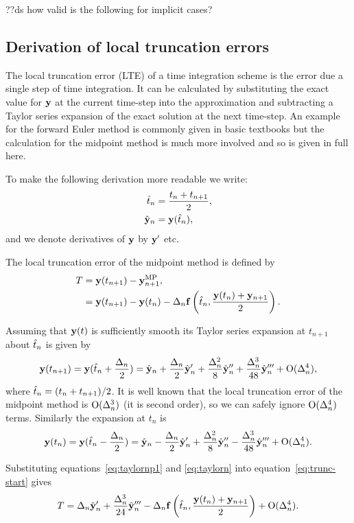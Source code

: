??ds how valid is the following for implicit cases?

\subsection{Derivation of local truncation errors}

The local truncation error (LTE) of a time integration scheme is the error due a single step of time integration.
It can be calculated by substituting the exact value for $\mathbf{y}$ at the current time-step into the approximation and subtracting a Taylor series expansion of the exact solution at the next time-step.
An example for the forward Euler method is commonly given in basic textbooks but the calculation for the midpoint method is much more involved and so is given in full here.

To make the following derivation more readable we write:
\begin{align}
  \hat{t}_n &= \frac{t_n + t_{n+1}}{2}, \notag\\
  \hat{\mathbf{y}}_n &= \mathbf{y}(\hat{t}_n),
\end{align}
and we denote derivatives of $\mathbf{y}$ by $\mathbf{y}'$ etc.

The local truncation error of the midpoint method is defined by
\begin{align}
  T &= \mathbf{y}(t_{n+1}) - \mathbf{y}_{n+1}^{\text{MP}}, \notag\\
  &= \mathbf{y}(t_{n+1}) - \mathbf{y}(t_n) - \Delta_{n} {\mathbf{f}}\left( \hat{t}_n, \frac{\mathbf{y}(t_n) + \mathbf{y}_{n+1}}{2} \right).
  \label{eq:trunc-start}
\end{align}

Assuming that $\mathbf{y}(t)$ is sufficiently smooth its Taylor series expansion at $t_{n+1}$ about $\hat{t}_n$ is given by
\begin{equation}
  \mathbf{y}(t_{n+1}) = \mathbf{y}(\hat{t}_n + \frac{\Delta_{n}}{2}) = \hat{\mathbf{y}}_n + \frac{\Delta_{n}}{2} \hat{\mathbf{y}}_n' + \frac{\Delta_{n}^2}{8} \hat{\mathbf{y}}_n'' + \frac{\Delta_{n}^3}{48} \hat{\mathbf{y}}_n''' + \text{O}(\Delta_{n}^4),
  \label{eq:taylornp1}
\end{equation}
where $\hat{t}_n = (t_n + t_{n+1})/2$.
It is well known that the local truncation error of the midpoint method is $\text{O}(\Delta_{n}^3)$ (\ie it is second order), so we can safely ignore $\text{O}(\Delta_{n}^4)$ terms.
Similarly the expansion at $t_n$ is
\begin{equation}
  \mathbf{y}(t_n) = \mathbf{y}(\hat{t}_n - \frac{\Delta_{n}}{2}) = \hat{\mathbf{y}}_n - \frac{\Delta_{n}}{2} \hat{\mathbf{y}}_n' + \frac{\Delta_{n}^2}{8} \hat{\mathbf{y}}_n'' - \frac{\Delta_{n}^3}{48} \hat{\mathbf{y}}_n''' + \text{O}(\Delta_{n}^4).
  \label{eq:taylorn}
\end{equation}

Substituting equations~\eqref{eq:taylornp1} and \eqref{eq:taylorn} into equation~\eqref{eq:trunc-start} gives
\begin{equation}
  T = \Delta_{n} \hat{\mathbf{y}}_n' + \frac{\Delta_{n}^3}{24} \hat{\mathbf{y}}_n'''
  - \Delta_{n} {\mathbf{f}}\left( \hat{t}_n, \frac{\mathbf{y}(t_n) + \mathbf{y}_{n+1}}{2} \right)  + \text{O}(\Delta_{n}^4).
  \label{eq:trunc-mid}
\end{equation}

